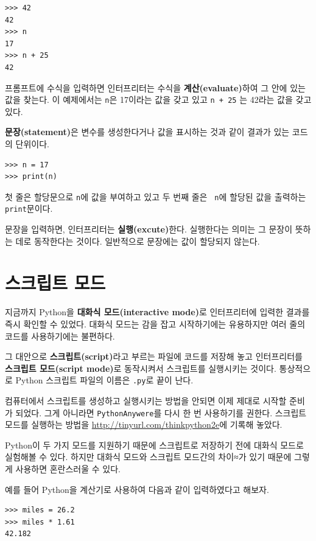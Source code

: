\documentclass[10pt]{book}
\begin{document}
\begin{verbatim}
>>> 42
42
>>> n
17
>>> n + 25
42
\end{verbatim}
%
프롬프트에 수식을 입력하면 인터프리터는 수식을 {\bf
계산(evaluate)}하여 그 안에 있는 값을 찾는다.  이 예제에서는 {\tt n}은
17이라는 값을 갖고 있고 {\tt n + 25} 는 42라는 값을 갖고 있다.

{\bf 문장(statement)}은 변수를 생성한다거나 값을 표시하는 것과 같이
결과가 있는 코드의 단위이다.

\begin{verbatim}
>>> n = 17
>>> print(n)
\end{verbatim}
%
첫 줄은 할당문으로 {\tt n}에 값을 부여하고 있고 두 번째 줄은 {\tt
  n}에 할당된 값을 출력하는 \texttt{print}문이다.

문장을 입력하면, 인터프리터는 {\bf 실행(excute)}한다. 실행한다는 의미는
그 문장이 뜻하는 데로 동작한다는 것이다.  일반적으로 문장에는 값이 할당되지 않는다. 


\section{스크립트 모드}

지금까지 Python을 {\bf 대화식 모드(interactive mode)}로 인터프리터에
입력한 결과를 즉시 확인할 수 있었다.  대화식 모드는 감을 잡고
시작하기에는 유용하지만 여러 줄의 코드를 사용하기에는 불편하다.

그 대안으로 {\bf 스크립트(script)}라고 부르는 파일에 코드를 저장해 놓고 인터프리터를 
{\bf 스크립트 모드(script mode)}로 동작시켜서 스크립트를 실행시키는 것이다. 
통상적으로 Python 스크립트 파일의 이름은 {\tt .py}로 끝이 난다. 

컴퓨터에서 스크립트를 생성하고 실행시키는 방법을 안되면 이제 제대로
시작할 준비가 되었다.  그게 아니라면 \texttt{PythonAnywere}를 다시 한
번 사용하기를 권한다.  스크립트 모드를 실행하는 방법을
\url{http://tinyurl.com/thinkpython2e}에 기록해 놓았다.

Python이 두 가지 모드를 지원하기 때문에 스크립트로 저장하기 전에 대화식
모드로 실험해볼 수 있다.  하지만 대화식 모드와 스크립트 모드간의 차이≈가
있기 때문에 그렇게 사용하면 혼란스러울 수 있다.

예를 들어 Python을 계산기로 사용하여 다음과 같이 입력하였다고 해보자. 

\begin{verbatim}
>>> miles = 26.2
>>> miles * 1.61
42.182
\end{verbatim}
\end{document}
